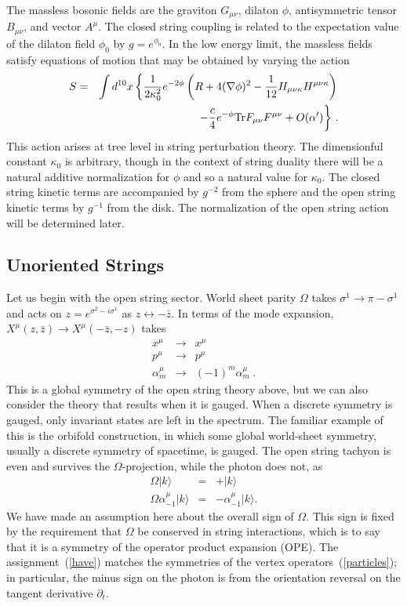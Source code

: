 \documentclass[12pt]{article}
\def\bea{\begin{eqnarray}}
\def\eea{\end{eqnarray}}
\def\ap{\alpha'}
\def\Tr{{\rm Tr}}
\begin{document}
The massless bosonic fields are the graviton
$G_{\mu\nu}$, dilaton $\phi$, antisymmetric tensor $B_{\mu\nu}$, and vector
$A^\mu$. The closed string coupling is related to the expectation value of the
dilaton field
$\phi_0$ by $g=e^{\phi_0}$.  In the low energy limit, the
massless fields satisfy equations of motion that may be obtained by
varying the action
\bea
S &=& \int
d^{10}x \left\{ {1\over2\kappa_0^2}
e^{-2\phi}\left(R+4(\nabla\phi)^2-{1\over12}
H_{\mu\nu\kappa}H^{\mu\nu\kappa}\right)\right. \nonumber\\
&&\qquad\qquad\qquad\qquad  -{c\over 4}e^{-\phi}\Tr
F_{\mu\nu}F^{\mu\nu} +O(\ap) \biggl\}\ . \label{stact}
\eea
This action arises at tree level in string perturbation theory.  
The dimensionful constant $\kappa_0$ is arbitrary, though in the context of
string duality there will be a natural additive normalization for $\phi$ and
so a natural value for $\kappa_0$.  The closed string kinetic terms are
accompanied by
$g^{-2}$ from the sphere and the open string kinetic terms by $g^{-1}$ from
the disk. The normalization of the open string action will be determined
later.

\subsection{Unoriented Strings}

Let us begin with the open string sector.  World sheet parity $\Omega$ takes
$\sigma^1 \to \pi-\sigma^1$ and acts on $z=e^{\sigma^2-i\sigma^1}$ as  
$z\leftrightarrow-\bar z$.  In terms of the mode expansion, $X^\mu(z,\bar z)
\to  X^\mu(-\bar z,- z)$ takes
\bea
x^\mu &\rightarrow& x^\mu \nonumber\\
p^\mu &\rightarrow& p^\mu \nonumber\\
\alpha^\mu_m &\rightarrow& (-1)^m\alpha^\mu_m\ .
\eea
This is a global symmetry of the open string theory above, but we can also
consider the theory that results when it is gauged.  When a discrete symmetry
is gauged, only invariant states are left in the spectrum.  The
familiar example of this is the orbifold construction, in which some
global world-sheet symmetry, usually a discrete symmetry of spacetime, is
gauged.
The open string tachyon is even and survives the 
$\Omega$-projection, while the photon does not, as
\bea
\Omega|{ k}\rangle &=& +|{ k}\rangle \nonumber\\
\Omega\alpha^\mu_{-1}|{ k}\rangle &=&  -\alpha^\mu_{-1}|{ k}\rangle.
\label{have}
\eea
We have made an assumption here about the overall sign of $\Omega$.  This
sign is fixed by the requirement that $\Omega$ be conserved in string
interactions, which is to say that it is a symmetry of the operator
product expansion (OPE).  The assignment~(\ref{have}) matches the symmetries
of the vertex operators~(\ref{particles}); in particular, the minus sign on
the photon is from the orientation reversal on the tangent derivative
$\partial_t$.
\end{document}
